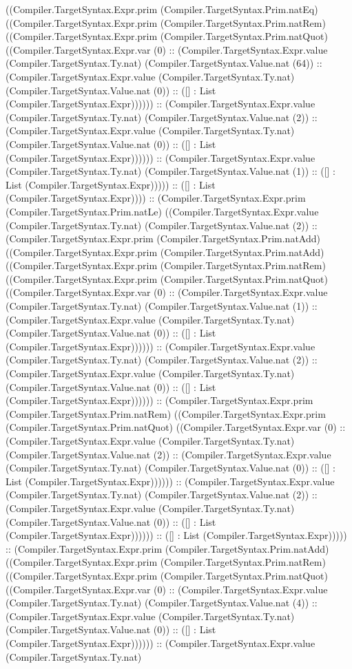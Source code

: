 \documentclass[11pt]{article}
\begin{document}
((Compiler.TargetSyntax.Expr.prim (Compiler.TargetSyntax.Prim.natEq) ((Compiler.TargetSyntax.Expr.prim (Compiler.TargetSyntax.Prim.natRem) ((Compiler.TargetSyntax.Expr.prim (Compiler.TargetSyntax.Prim.natQuot) ((Compiler.TargetSyntax.Expr.var (0) :: (Compiler.TargetSyntax.Expr.value (Compiler.TargetSyntax.Ty.nat) (Compiler.TargetSyntax.Value.nat (64)) :: (Compiler.TargetSyntax.Expr.value (Compiler.TargetSyntax.Ty.nat) (Compiler.TargetSyntax.Value.nat (0)) :: ([] : List (Compiler.TargetSyntax.Expr)))))) :: (Compiler.TargetSyntax.Expr.value (Compiler.TargetSyntax.Ty.nat) (Compiler.TargetSyntax.Value.nat (2)) :: (Compiler.TargetSyntax.Expr.value (Compiler.TargetSyntax.Ty.nat) (Compiler.TargetSyntax.Value.nat (0)) :: ([] : List (Compiler.TargetSyntax.Expr)))))) :: (Compiler.TargetSyntax.Expr.value (Compiler.TargetSyntax.Ty.nat) (Compiler.TargetSyntax.Value.nat (1)) :: ([] : List (Compiler.TargetSyntax.Expr))))) :: ([] : List (Compiler.TargetSyntax.Expr)))) :: (Compiler.TargetSyntax.Expr.prim (Compiler.TargetSyntax.Prim.natLe) ((Compiler.TargetSyntax.Expr.value (Compiler.TargetSyntax.Ty.nat) (Compiler.TargetSyntax.Value.nat (2)) :: (Compiler.TargetSyntax.Expr.prim (Compiler.TargetSyntax.Prim.natAdd) ((Compiler.TargetSyntax.Expr.prim (Compiler.TargetSyntax.Prim.natAdd) ((Compiler.TargetSyntax.Expr.prim (Compiler.TargetSyntax.Prim.natRem) ((Compiler.TargetSyntax.Expr.prim (Compiler.TargetSyntax.Prim.natQuot) ((Compiler.TargetSyntax.Expr.var (0) :: (Compiler.TargetSyntax.Expr.value (Compiler.TargetSyntax.Ty.nat) (Compiler.TargetSyntax.Value.nat (1)) :: (Compiler.TargetSyntax.Expr.value (Compiler.TargetSyntax.Ty.nat) (Compiler.TargetSyntax.Value.nat (0)) :: ([] : List (Compiler.TargetSyntax.Expr)))))) :: (Compiler.TargetSyntax.Expr.value (Compiler.TargetSyntax.Ty.nat) (Compiler.TargetSyntax.Value.nat (2)) :: (Compiler.TargetSyntax.Expr.value (Compiler.TargetSyntax.Ty.nat) (Compiler.TargetSyntax.Value.nat (0)) :: ([] : List (Compiler.TargetSyntax.Expr)))))) :: (Compiler.TargetSyntax.Expr.prim (Compiler.TargetSyntax.Prim.natRem) ((Compiler.TargetSyntax.Expr.prim (Compiler.TargetSyntax.Prim.natQuot) ((Compiler.TargetSyntax.Expr.var (0) :: (Compiler.TargetSyntax.Expr.value (Compiler.TargetSyntax.Ty.nat) (Compiler.TargetSyntax.Value.nat (2)) :: (Compiler.TargetSyntax.Expr.value (Compiler.TargetSyntax.Ty.nat) (Compiler.TargetSyntax.Value.nat (0)) :: ([] : List (Compiler.TargetSyntax.Expr)))))) :: (Compiler.TargetSyntax.Expr.value (Compiler.TargetSyntax.Ty.nat) (Compiler.TargetSyntax.Value.nat (2)) :: (Compiler.TargetSyntax.Expr.value (Compiler.TargetSyntax.Ty.nat) (Compiler.TargetSyntax.Value.nat (0)) :: ([] : List (Compiler.TargetSyntax.Expr)))))) :: ([] : List (Compiler.TargetSyntax.Expr))))) :: (Compiler.TargetSyntax.Expr.prim (Compiler.TargetSyntax.Prim.natAdd) ((Compiler.TargetSyntax.Expr.prim (Compiler.TargetSyntax.Prim.natRem) ((Compiler.TargetSyntax.Expr.prim (Compiler.TargetSyntax.Prim.natQuot) ((Compiler.TargetSyntax.Expr.var (0) :: (Compiler.TargetSyntax.Expr.value (Compiler.TargetSyntax.Ty.nat) (Compiler.TargetSyntax.Value.nat (4)) :: (Compiler.TargetSyntax.Expr.value (Compiler.TargetSyntax.Ty.nat) (Compiler.TargetSyntax.Value.nat (0)) :: ([] : List (Compiler.TargetSyntax.Expr)))))) :: (Compiler.TargetSyntax.Expr.value (Compiler.TargetSyntax.Ty.nat) 
\end{document}
